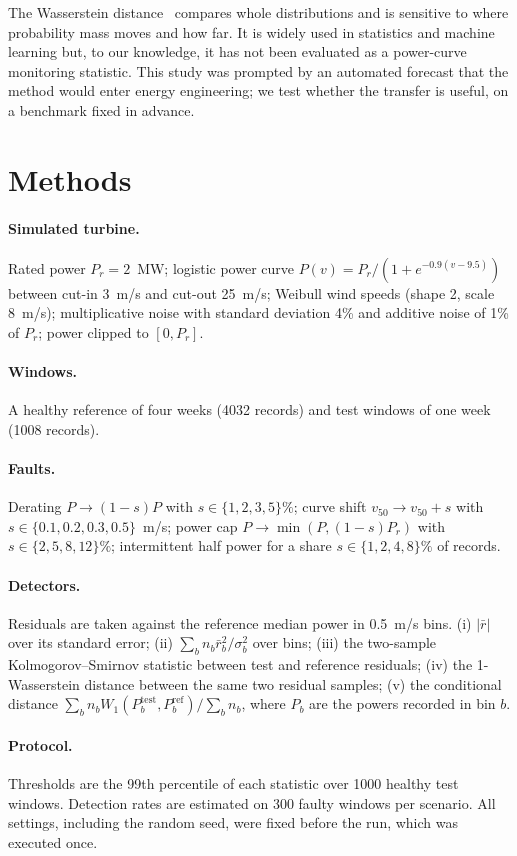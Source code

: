 \documentclass[11pt]{article}
\begin{document}
The Wasserstein distance~\cite{Villani} compares whole distributions and is sensitive to where probability mass moves
and how far. It is widely used in statistics and machine learning but, to our knowledge, it has not been evaluated as
a power-curve monitoring statistic. This study was prompted by an automated forecast that the method would enter
energy engineering; we test whether the transfer is useful, on a benchmark fixed in advance.

\section{Methods}
\paragraph{Simulated turbine.} Rated power $P_r=2$~MW; logistic power curve $P(v)=P_r/(1+e^{-0.9(v-9.5)})$ between
cut-in 3~m/s and cut-out 25~m/s; Weibull wind speeds (shape 2, scale 8~m/s); multiplicative noise with standard
deviation 4\% and additive noise of 1\% of $P_r$; power clipped to $[0,P_r]$.
\paragraph{Windows.} A healthy reference of four weeks (4032 records) and test windows of one week (1008 records).
\paragraph{Faults.} Derating $P\to(1-s)P$ with $s\in\{1,2,3,5\}\%$; curve shift $v_{50}\to v_{50}+s$ with
$s\in\{0.1,0.2,0.3,0.5\}$~m/s; power cap $P\to\min(P,(1-s)P_r)$ with $s\in\{2,5,8,12\}\%$; intermittent half power
for a share $s\in\{1,2,4,8\}\%$ of records.
\paragraph{Detectors.} Residuals are taken against the reference median power in 0.5~m/s bins.
(i) $|\bar r|$ over its standard error; (ii) $\sum_b n_b \bar r_b^2/\sigma_b^2$ over bins; (iii) the two-sample
Kolmogorov--Smirnov statistic between test and reference residuals; (iv) the 1-Wasserstein distance between the same
two residual samples; (v) the conditional distance $\sum_b n_b W_1(P_b^{\text{test}},P_b^{\text{ref}})/\sum_b n_b$,
where $P_b$ are the powers recorded in bin $b$.
\paragraph{Protocol.} Thresholds are the 99th percentile of each statistic over 1000 healthy test windows. Detection
rates are estimated on 300 faulty windows per scenario. All settings, including the random seed, were fixed before
the run, which was executed once.
\end{document}
